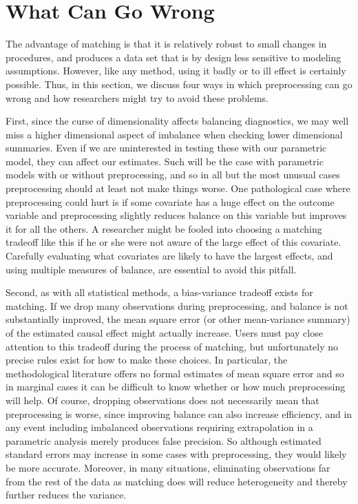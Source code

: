 \documentclass[11pt,titlepage]{article}
\begin{document}
\section{What Can Go Wrong}

The advantage of matching is that it is relatively robust to small
changes in procedures, and produces a data set that is by design less
sensitive to modeling assumptions.  However, like any method, using it
badly or to ill effect is certainly possible.  Thus, in this section,
we discuss four ways in which preprocessing can go wrong and how
researchers might try to avoid these problems.

First, since the curse of dimensionality affects balancing
diagnostics, we may well miss a higher dimensional aspect of imbalance
when checking lower dimensional summaries.  Even if we are
uninterested in testing these with our parametric model, they can
affect our estimates.  Such will be the case with parametric models
with or without preprocessing, and so in all but the most unusual
cases preprocessing should at least not make things worse.  One
pathological case where preprocessing could hurt is if some covariate
has a huge effect on the outcome variable and preprocessing slightly
reduces balance on this variable but improves it for all the others.
A researcher might be fooled into choosing a matching tradeoff like
this if he or she were not aware of the large effect of this
covariate.  Carefully evaluating what covariates are likely to have
the largest effects, and using multiple measures of balance, are
essential to avoid this pitfall.

Second, as with all statistical methods, a bias-variance tradeoff
exists for matching.  If we drop many observations during
preprocessing, and balance is not substantially improved, the mean
square error (or other mean-variance summary) of the estimated causal
effect might actually increase.  Users must pay close attention to
this tradeoff during the process of matching, but unfortunately no
precise rules exist for how to make these choices.  In particular, the
methodological literature offers no formal estimates of mean square
error and so in marginal cases it can be difficult to know whether or
how much preprocessing will help.  Of course, dropping observations
does not necessarily mean that preprocessing is worse, since improving
balance can also increase efficiency, and in any event including
imbalanced observations requiring extrapolation in a parametric
analysis merely produces false precision.  So although estimated
standard errors may increase in some cases with preprocessing, they
would likely be more accurate.  Moreover, in many situations,
eliminating observations far from the rest of the data as matching
does will reduce heterogeneity and thereby further reduces the
variance.
\end{document}
